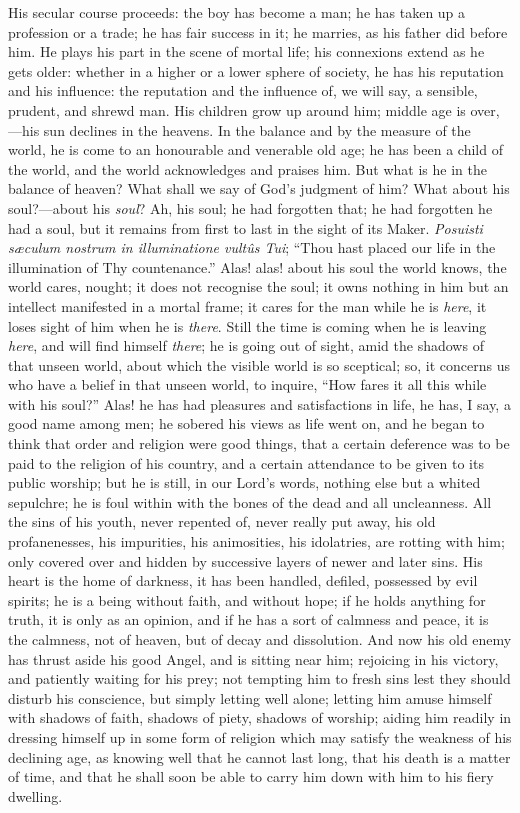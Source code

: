 His secular course proceeds: the boy has become a man; he has taken
up a profession or a trade; he has fair success in it; he marries, as
his father did before him. He plays his part in the scene of mortal
life; his connexions extend as he gets older: whether in a higher or a
lower sphere of society, he has his reputation and his influence: the
reputation and the influence of, we will say, a sensible, prudent, and
shrewd man. His children grow up around him; middle age is over,—his
sun declines in the heavens. In the balance and by the measure of the
world, he is come to an honourable and venerable old age; he has been
a child of the world, and the world acknowledges and praises him. But
what is he in the balance of heaven? What shall we say of God's
judgment of him? What about his soul?—about his \emph{soul}? Ah, his
soul; he had forgotten that; he had forgotten he had a soul, but it
remains from first to last in the sight of its Maker. \emph{Posuisti
sæculum nostrum in illuminatione vultûs Tui}; ``Thou hast
placed our life in the illumination of Thy countenance.'' Alas!
alas! about his soul the world knows, the world cares, nought; it does
not recognise the soul; it owns nothing in him but an intellect manifested in a mortal frame; it cares for the man while he is \emph{here},
it loses sight of him when he is \emph{there}. Still the time is
coming when he is leaving \emph{here}, and will find himself \emph{there};
he is going out of sight, amid the shadows of that unseen world, about
which the visible world is so sceptical; so, it concerns us who have a
belief in that unseen world, to inquire, ``How fares it all this
while with his soul?'' Alas! he has had pleasures and
satisfactions in life, he has, I say, a good name among men; he
sobered his views as life went on, and he began to think that order
and religion were good things, that a certain deference was to be paid
to the religion of his country, and a certain attendance to be given
to its public worship; but he is still, in our Lord's words, nothing
else but a whited sepulchre; he is foul within with the bones of the
dead and all uncleanness. All the sins of his youth, never repented
of, never really put away, his old profanenesses, his impurities, his
animosities, his idolatries, are rotting with him; only covered over
and hidden by successive layers of newer and later sins. His heart is
the home of darkness, it has been handled, defiled, possessed by evil
spirits; he is a being without faith, and without hope; if he holds
anything for truth, it is only as an opinion, and if he has a sort of
calmness and peace, it is the calmness, not of heaven, but of decay
and dissolution. And now his old enemy has thrust aside his good
Angel, and is sitting near him; rejoicing in his victory, and
patiently waiting for his prey; not tempting him to fresh sins lest
they should disturb his conscience, but simply letting well alone;
letting him amuse himself with shadows of faith, shadows of piety,
shadows of worship; aiding him readily in dressing himself up in some
form of religion which may satisfy the weakness of his declining age,
as knowing well that he cannot last long, that his death is a matter
of time, and that he shall soon be able to carry him down with him to
his fiery dwelling.

